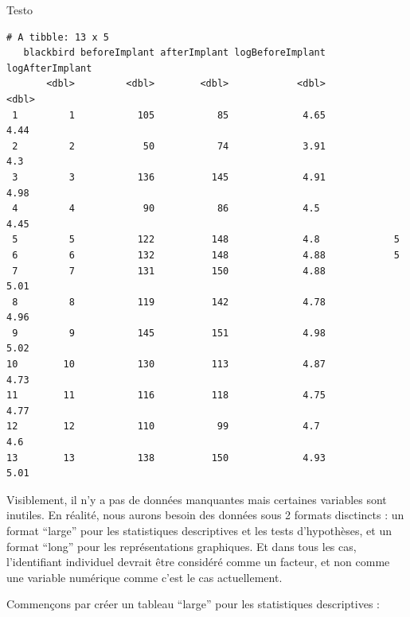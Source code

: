 \documentclass[
  a4paper,
]{article}
\newenvironment{Shaded}{\begin{snugshade}}{\end{snugshade}}
\newcommand{\DataTypeTok}[1]{\textcolor[rgb]{0.00,0.34,0.68}{#1}}
\newcommand{\KeywordTok}[1]{\textcolor[rgb]{0.12,0.11,0.11}{\textbf{#1}}}
\newcommand{\NormalTok}[1]{\textcolor[rgb]{0.12,0.11,0.11}{#1}}
\newcommand{\OperatorTok}[1]{\textcolor[rgb]{0.12,0.11,0.11}{#1}}
\newcommand{\StringTok}[1]{\textcolor[rgb]{0.75,0.01,0.01}{#1}}
\begin{document}
\begin{Shaded}
\begin{Highlighting}[]
\NormalTok{Testo}
\end{Highlighting}
\end{Shaded}

\begin{verbatim}
# A tibble: 13 x 5
   blackbird beforeImplant afterImplant logBeforeImplant logAfterImplant
       <dbl>         <dbl>        <dbl>            <dbl>           <dbl>
 1         1           105           85             4.65            4.44
 2         2            50           74             3.91            4.3 
 3         3           136          145             4.91            4.98
 4         4            90           86             4.5             4.45
 5         5           122          148             4.8             5   
 6         6           132          148             4.88            5   
 7         7           131          150             4.88            5.01
 8         8           119          142             4.78            4.96
 9         9           145          151             4.98            5.02
10        10           130          113             4.87            4.73
11        11           116          118             4.75            4.77
12        12           110           99             4.7             4.6 
13        13           138          150             4.93            5.01
\end{verbatim}

Visiblement, il n'y a pas de données manquantes mais certaines variables sont inutiles. En réalité, nous aurons besoin des données sous 2 formats disctincts : un format ``large'' pour les statistiques descriptives et les tests d'hypothèses, et un format ``long'' pour les représentations graphiques. Et dans tous les cas, l'identifiant individuel devrait être considéré comme un facteur, et non comme une variable numérique comme c'est le cas actuellement.

Commençons par créer un tableau ``large'' pour les statistiques descriptives :

\begin{Shaded}
\end{Shaded}
\end{document}
